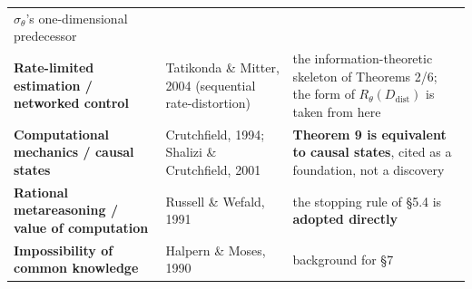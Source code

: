 \documentclass[11pt]{article}
\begin{document}
\begin{longtable}[]{@{}lll@{}}
\begin{minipage}[t]{0.30\columnwidth}
\(\sigma_\theta\)'s one-dimensional predecessor\strut
\end{minipage}\tabularnewline
\begin{minipage}[t]{0.30\columnwidth}\raggedright
\textbf{Rate-limited estimation / networked control}\strut
\end{minipage} & \begin{minipage}[t]{0.30\columnwidth}\raggedright
Tatikonda \& Mitter, 2004 (sequential rate-distortion)\strut
\end{minipage} & \begin{minipage}[t]{0.30\columnwidth}\raggedright
the information-theoretic skeleton of Theorems 2/6; the form of \(R_\theta(D_{\mathrm{dist}})\) is taken from here\strut
\end{minipage}\tabularnewline
\begin{minipage}[t]{0.30\columnwidth}\raggedright
\textbf{Computational mechanics / causal states}\strut
\end{minipage} & \begin{minipage}[t]{0.30\columnwidth}\raggedright
Crutchfield, 1994; Shalizi \& Crutchfield, 2001\strut
\end{minipage} & \begin{minipage}[t]{0.30\columnwidth}\raggedright
\textbf{Theorem 9 is equivalent to causal states}, cited as a foundation, not a discovery\strut
\end{minipage}\tabularnewline
\begin{minipage}[t]{0.30\columnwidth}\raggedright
\textbf{Rational metareasoning / value of computation}\strut
\end{minipage} & \begin{minipage}[t]{0.30\columnwidth}\raggedright
Russell \& Wefald, 1991\strut
\end{minipage} & \begin{minipage}[t]{0.30\columnwidth}\raggedright
the stopping rule of \S{}5.4 is \textbf{adopted directly}\strut
\end{minipage}\tabularnewline
\begin{minipage}[t]{0.30\columnwidth}\raggedright
\textbf{Impossibility of common knowledge}\strut
\end{minipage} & \begin{minipage}[t]{0.30\columnwidth}\raggedright
Halpern \& Moses, 1990\strut
\end{minipage} & \begin{minipage}[t]{0.30\columnwidth}\raggedright
background for \S{}7\strut
\end{minipage}\tabularnewline

\end{longtable}
\end{document}

